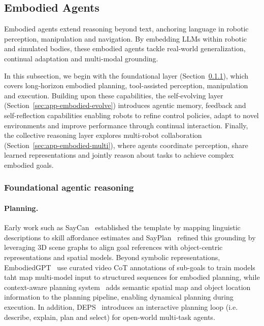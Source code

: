 \subsection{Embodied Agents}
\label{sec:app-embodied}


Embodied agents extend reasoning beyond text, anchoring language in robotic perception, manipulation and navigation.  By embedding LLMs within robotic and simulated bodies, these embodied agents tackle real-world generalization, continual adaptation and multi-modal grounding.  

In this subsection, we begin with the foundational layer (Section~\ref{sec:app-embodied-planning}), which covers long-horizon embodied planning, tool-assisted perception, manipulation and execution. Building upon these capabilities, the self-evolving layer (Section~\ref{sec:app-embodied-evolve}) introduces agentic memory, feedback and self-reflection capabilities  enabling robots to refine control policies, adapt to novel environments and improve performance through continual interaction. Finally, the collective reasoning layer explores multi-robot collaboration (Section~\ref{sec:app-embodied-multi}), where agents coordinate perception, share learned representations and jointly reason about tasks to achieve complex embodied goals.

\subsubsection{Foundational agentic reasoning}


\label{sec:app-embodied-planning}

\paragraph{Planning.}


Early work such as SayCan~\cite{ahn2022icanisay} established the template by mapping linguistic descriptions to skill affordance estimates and  SayPlan~\cite{DBLP:conf/corl/RanaHGA0S23} refined this grounding by leveraging 3D scene graphs to align goal references with object-centric representations and spatial models. Beyond symbolic representations, EmbodiedGPT~\cite{mu2023embodiedgptvisionlanguagepretrainingembodied} use curated video CoT annotations of sub-goals to train models taht map multi-model input to structured sequences for embodied planning, while context-aware planning system~\cite{kim2024contextawareplanningenvironmentawarememory} adds semantic spatial map and object location information to the planning pipeline, enabling dynamical planning during execution.  In addition, DEPS~\cite{DBLP:journals/corr/abs-2302-01560} introduces an interactive planning loop (i.e. describe, explain, plan and select) for open-world multi-task agents. 


